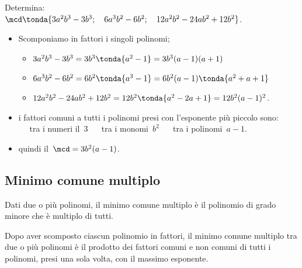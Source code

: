 \begin{esempio}{}{}
Determina:\\
\(\mcd \tonda{3a^{2}b^{3}-3b^{3};\quad 6a^{3}b^{2}-6b^{2}; 
            \quad 12a^{2}b^{2}-24ab^{2}+12b^{2}} \).
\begin{itemize}[nosep]
\item Scomponiamo in fattori i singoli polinomi;
\begin{itemize}[nosep]
\item \(3a^{2}b^{3}-3b^{3}=3b^{3} \tonda{a^{2}-1} =3b^{3}(a-1)(a+1)\)
\item \(6a^{3}b^{2}-6b^{2}=6b^{2} \tonda{a^{3}-1} =
        6b^{2}(a-1) \tonda{a^{2}+a+1} \)
\item \(12a^{2}b^{2}-24ab^{2}+12b^{2}=12b^{2} \tonda{a^{2}-2a+1} =
        12b^{2}(a-1)^{2}\).
\end{itemize}
\item i fattori comuni a tutti i polinomi presi con l'esponente più 
piccolo sono: \\
\textcolor{Salmon}{} ~~ tra i numeri il~\(3\) \hfill
\textcolor{Salmon}{} ~~ tra i monomi~\(b^{2}\) \hfill
\textcolor{Salmon}{} ~~ tra i polinomi~\(a-1\).
\item quindi il~\(\mcd=3b^{2}(a-1)\).
\end{itemize}
\end{esempio}

\subsection{Minimo comune multiplo}

\begin{definizione}{}{}
Dati due o più polinomi, il minimo comune multiplo è il polinomio 
di grado minore che è multiplo di tutti.
\end{definizione}

\begin{teorema}{}{}
Dopo aver scomposto ciascun polinomio in fattori, il minimo comune 
multiplo tra due o più polinomi è il prodotto dei fattori comuni e non 
comuni di tutti i polinomi, presi una sola volta, con il massimo 
esponente.
\end{teorema}

